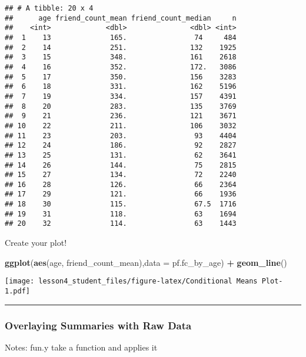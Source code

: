 \documentclass[]{article}
\newenvironment{Shaded}{\begin{snugshade}}{\end{snugshade}}
\newcommand{\KeywordTok}[1]{\textcolor[rgb]{0.13,0.29,0.53}{\textbf{#1}}}
\newcommand{\DataTypeTok}[1]{\textcolor[rgb]{0.13,0.29,0.53}{#1}}
\newcommand{\StringTok}[1]{\textcolor[rgb]{0.31,0.60,0.02}{#1}}
\newcommand{\OperatorTok}[1]{\textcolor[rgb]{0.81,0.36,0.00}{\textbf{#1}}}
\newcommand{\NormalTok}[1]{#1}
\begin{document}
\begin{verbatim}
## # A tibble: 20 x 4
##      age friend_count_mean friend_count_median     n
##    <int>             <dbl>               <dbl> <int>
##  1    13              165.                74     484
##  2    14              251.               132    1925
##  3    15              348.               161    2618
##  4    16              352.               172.   3086
##  5    17              350.               156    3283
##  6    18              331.               162    5196
##  7    19              334.               157    4391
##  8    20              283.               135    3769
##  9    21              236.               121    3671
## 10    22              211.               106    3032
## 11    23              203.                93    4404
## 12    24              186.                92    2827
## 13    25              131.                62    3641
## 14    26              144.                75    2815
## 15    27              134.                72    2240
## 16    28              126.                66    2364
## 17    29              121.                66    1936
## 18    30              115.                67.5  1716
## 19    31              118.                63    1694
## 20    32              114.                63    1443
\end{verbatim}

Create your plot!

\begin{Shaded}
\begin{Highlighting}[]
\KeywordTok{ggplot}\NormalTok{(}\KeywordTok{aes}\NormalTok{(age, friend_count_mean),}\DataTypeTok{data =}\NormalTok{ pf.fc_by_age) }\OperatorTok{+}
\StringTok{  }\KeywordTok{geom_line}\NormalTok{()}
\end{Highlighting}
\end{Shaded}

\texttt{[image: lesson4\_student\_files/figure-latex/Conditional Means Plot-1.pdf]}

\begin{center}\rule{0.5\linewidth}{\linethickness}\end{center}

\subsubsection{Overlaying Summaries with Raw
Data}\label{overlaying-summaries-with-raw-data}

Notes: fun.y take a function and applies it
\end{document}
